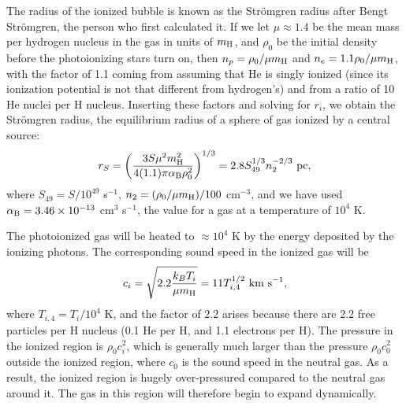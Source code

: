 The radius of the ionized bubble is known as the Str\"omgren radius after Bengt Str\"omgren, the person who first calculated it. If we let $\mu\approx 1.4$ be the mean mass per hydrogen nucleus in the gas in units of $m_{\rm H}$, and $\rho_0$ be the initial density before the photoionizing stars turn on, then $n_p = \rho_0/\mu m_{\rm H}$ and $n_e = 1.1 \rho_0/\mu m_{\rm H}$, with the factor of 1.1 coming from assuming that He is singly ionized (since its ionization potential is not that different from hydrogen's) and from a ratio of 10 He nuclei per H nucleus. Inserting these factors and solving for $r_i$, we obtain the Str\"omgren radius, the equilibrium radius of a sphere of gas ionized by a central source:
\begin{equation}
r_S = \left(\frac{3 S \mu^2 m_{\rm H}^2}{4(1.1) \pi \alpha_{\mathrm{B}} \rho_0^2}\right)^{1/3} = 2.8 S_{49}^{1/3} n_2^{-2/3}\mbox{ pc},
\end{equation}
where $S_{49} = S/10^{49}$ s$^{-1}$, $n_2 = (\rho_0/\mu m_{\rm H})/100$ cm$^{-3}$, and we have used $\alpha_{\mathrm{B}} = 3.46\times 10^{-13}$ cm$^3$ s$^{-1}$, the value for a gas at a temperature of $10^4$ K.

The photoionized gas will be heated to $\approx 10^4$ K by the energy deposited by the ionizing photons. The corresponding sound speed in the ionized gas will be
\begin{equation}
c_i = \sqrt{2.2 \frac{k_B T_i}{\mu m_{\rm H}}} = 11 T_{i,4}^{1/2}\mbox{ km s}^{-1},
\end{equation}
where $T_{i,4} = T_i/10^4$ K, and the factor of $2.2$ arises because there are 2.2 free particles per H nucleus (0.1 He per H, and 1.1 electrons per H). The pressure in the ionized region is $\rho_0 c_i^2$, which is generally much larger than the pressure $\rho_0 c_0^2$ outside the ionized region, where $c_0$ is the sound speed in the neutral gas. As a result, the ionized region is hugely over-pressured compared to the neutral gas around it. The gas in this region will therefore begin to expand dynamically.

